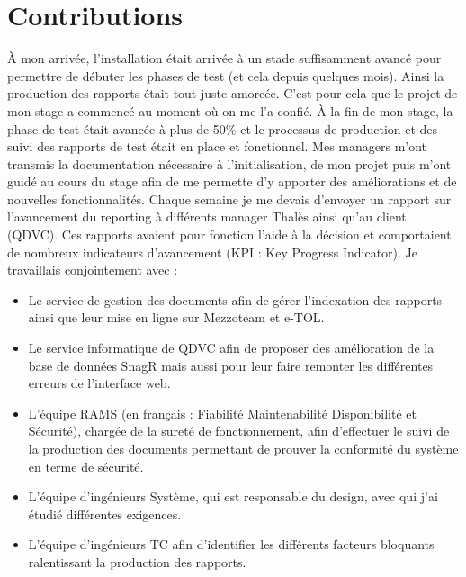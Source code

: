 \section{Contributions}
À mon arrivée, l'installation était arrivée à un stade suffisamment avancé pour permettre de débuter les phases de test (et cela depuis quelques mois).
Ainsi la production des rapports était tout juste amorcée.
C'est pour cela que le projet de mon stage a commencé au moment où on me l'a confié.
À la fin de mon stage, la phase de test était avancée à plus de 50\% et le processus de production et des suivi des rapports de test était en place et fonctionnel.
Mes managers m'ont transmis la documentation nécessaire à l'initialisation, de mon projet puis m'ont guidé au cours du stage afin de me permette d'y apporter des améliorations et de nouvelles fonctionnalités. 
Chaque semaine je me devais d'envoyer un rapport sur l'avancement du \gls{reporting} à différents manager Thalès ainsi qu'au client (QDVC).
Ces rapports avaient pour fonction l'aide à la décision et comportaient de nombreux indicateurs d'avancement (\gls{KPI} : Key Progress Indicator).
Je travaillais conjointement avec :
\begin{itemize}
\item Le service de gestion des documents afin de gérer l'indexation des rapports ainsi que leur mise en ligne sur \gls{Mezzoteam} et \gls{e-TOL}.
\item Le service informatique de QDVC afin de proposer des amélioration de la base de données SnagR mais aussi pour leur faire remonter les différentes erreurs de l'interface web.
\item L'équipe \gls{RAMS}  (en français : Fiabilité Maintenabilité Disponibilité et Sécurité), chargée de la sureté de fonctionnement, afin d'effectuer le suivi de la production des documents permettant de prouver la conformité du système en terme de sécurité.
\item L'équipe d'ingénieurs Système, qui est responsable du design, avec qui j'ai étudié différentes exigences.
\item L'équipe d'ingénieurs \gls{TC} afin d'identifier les différents facteurs bloquants ralentissant la production des rapports.
\end{itemize}


